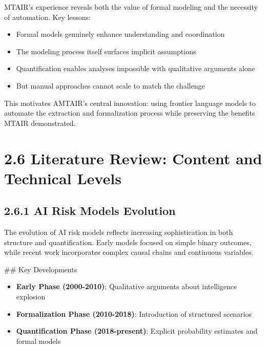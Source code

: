 \documentclass[
  11pt,
  letterpaper,
]{book}
\providecommand{\tightlist}{%
  \setlength{\itemsep}{0pt}\setlength{\parskip}{0pt}}
\begin{document}
MTAIR's experience reveals both the value of formal modeling and the
necessity of automation. Key lessons:

\begin{itemize}
\tightlist
\item
  Formal models genuinely enhance understanding and coordination
\item
  The modeling process itself surfaces implicit assumptions
\item
  Quantification enables analyses impossible with qualitative arguments
  alone
\item
  But manual approaches cannot scale to match the challenge
\end{itemize}

This motivates AMTAIR's central innovation: using frontier language
models to automate the extraction and formalization process while
preserving the benefits MTAIR demonstrated.

\section*{2.6 Literature Review: Content and Technical
Levels}\label{sec-literature-review}


\subsection*{2.6.1 AI Risk Models
Evolution}\label{sec-risk-models-evolution}

The evolution of AI risk models reflects increasing sophistication in
both structure and quantification. Early models focused on simple binary
outcomes, while recent work incorporates complex causal chains and
continuous variables.

\begin{tcolorbox}[enhanced jigsaw, toprule=.15mm, colbacktitle=quarto-callout-note-color!10!white, opacitybacktitle=0.6, leftrule=.75mm, coltitle=black, rightrule=.15mm, opacityback=0, bottomtitle=1mm, title=\textcolor{quarto-callout-note-color}{\faInfo}\hspace{0.5em}{Note}, toptitle=1mm, breakable, titlerule=0mm, left=2mm, arc=.35mm, colframe=quarto-callout-note-color-frame, bottomrule=.15mm, colback=white]

\#\# Key Developments

\begin{itemize}
\tightlist
\item
  \textbf{Early Phase (2000-2010)}: Qualitative arguments about
  intelligence explosion
\item
  \textbf{Formalization Phase (2010-2018)}: Introduction of structured
  scenarios
\item
  \textbf{Quantification Phase (2018-present)}: Explicit probability
  estimates and formal models
\end{itemize}

\end{tcolorbox}
\end{document}
